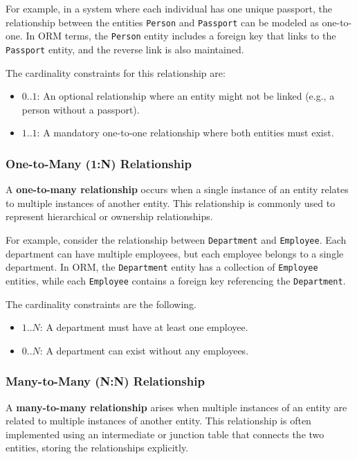 For example, in a system where each individual has one unique passport, the relationship between the entities \texttt{Person} and \texttt{Passport} can be modeled as one-to-one. In ORM terms, the \texttt{Person} entity includes a foreign key that links to the \texttt{Passport} entity, and the reverse link is also maintained.

The cardinality constraints for this relationship are:
\begin{itemize}
    \item \(0..1\): An optional relationship where an entity might not be linked (e.g., a person without a passport).
    \item \(1..1\): A mandatory one-to-one relationship where both entities must exist.
\end{itemize}

\subsubsection{One-to-Many (1:N) Relationship} A \textbf{one-to-many relationship} occurs when a single instance of an entity relates to multiple instances of another entity. This relationship is commonly used to represent hierarchical or ownership relationships.

For example, consider the relationship between \texttt{Department} and \texttt{Employee}. Each department can have multiple employees, but each employee belongs to a single department. In ORM, the \texttt{Department} entity has a collection of \texttt{Employee} entities, while each \texttt{Employee} contains a foreign key referencing the \texttt{Department}.

The cardinality constraints are the following.
\begin{itemize}
    \item \(1..N\): A department must have at least one employee.
    \item \(0..N\): A department can exist without any employees.
\end{itemize}

\subsubsection{Many-to-Many (N:N) Relationship} A \textbf{many-to-many relationship} arises when multiple instances of an entity are related to multiple instances of another entity. This relationship is often implemented using an intermediate or junction table that connects the two entities, storing the relationships explicitly.

